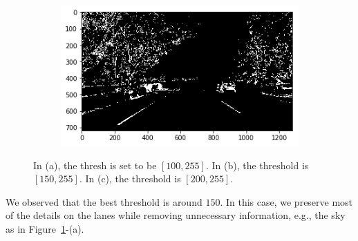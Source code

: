 \documentclass[draftcls,onecolumn,12pt]{IEEEtran}
\theoremstyle{plain}
\theoremstyle{plain}
\begin{document}
\begin{figure}[htb!!]
        \begin{subfigure}[t]{0.3\textwidth}
        \includegraphics[width=\textwidth]{./figures/schannel200.png}\\
        \caption{}
    \end{subfigure}
    \caption{In (a), the thresh is set to be $[100, 255]$. In (b), the threshold is $[150, 255]$. In (c), the threshold is $[200, 255].$}\label{Fig:Schannel}
\end{figure}
We observed that the best threshold is around $150.$ In this case, we preserve most of the details on the lanes while removing unnecessary information, e.g., the sky as in Figure~\ref{Fig:Schannel}-(a).
\end{document}
